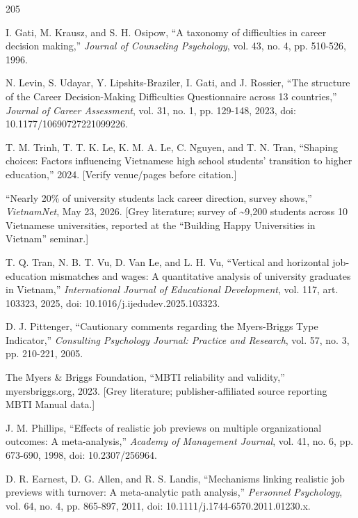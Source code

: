 \newpage
\begingroup\sloppy
\begin{thebibliography}{205}
 I. Gati, M. Krausz, and S. H. Osipow, ``A taxonomy of difficulties in career decision making,'' \textit{Journal of Counseling Psychology}, vol. 43, no. 4, pp. 510-526, 1996.

 N. Levin, S. Udayar, Y. Lipshits-\allowbreak{}Braziler, I. Gati, and J. Rossier, ``The structure of the Career Decision-\allowbreak{}Making Difficulties Questionnaire across 13 countries,'' \textit{Journal of Career Assessment}, vol. 31, no. 1, pp. 129-148, 2023, doi: 10.\allowbreak{}1177/\allowbreak{}10690727221099226.

 T. M. Trinh, T. T. K. Le, K. M. A. Le, C. Nguyen, and T. N. Tran, ``Shaping choices: Factors influencing Vietnamese high school students' transition to higher education,'' 2024. [Verify venue/pages before citation.]

 ``Nearly 20\% of university students lack career direction, survey shows,'' \textit{VietnamNet}, May 23, 2026. [Grey literature; survey of \textasciitilde{}9,200 students across 10 Vietnamese universities, reported at the ``Building Happy Universities in Vietnam'' seminar.]

 T. Q. Tran, N. B. T. Vu, D. Van Le, and L. H. Vu, ``Vertical and horizontal job-\allowbreak{}education mismatches and wages: A quantitative analysis of university graduates in Vietnam,'' \textit{International Journal of Educational Development}, vol. 117, art. 103323, 2025, doi: 10.\allowbreak{}1016/\allowbreak{}j.\allowbreak{}ijedudev.\allowbreak{}2025.\allowbreak{}103323.

 D. J. Pittenger, ``Cautionary comments regarding the Myers-\allowbreak{}Briggs Type Indicator,'' \textit{Consulting Psychology Journal: Practice and Research}, vol. 57, no. 3, pp. 210-221, 2005.

 The Myers \& Briggs Foundation, ``MBTI reliability and validity,'' myersbriggs.\allowbreak{}org, 2023. [Grey literature; publisher-\allowbreak{}affiliated source reporting MBTI Manual data.]

 J. M. Phillips, ``Effects of realistic job previews on multiple organizational outcomes: A meta-\allowbreak{}analysis,'' \textit{Academy of Management Journal}, vol. 41, no. 6, pp. 673-690, 1998, doi: 10.\allowbreak{}2307/\allowbreak{}256964.

 D. R. Earnest, D. G. Allen, and R. S. Landis, ``Mechanisms linking realistic job previews with turnover: A meta-\allowbreak{}analytic path analysis,'' \textit{Personnel Psychology}, vol. 64, no. 4, pp. 865-897, 2011, doi: 10.\allowbreak{}1111/\allowbreak{}j.\allowbreak{}1744-\allowbreak{}6570.\allowbreak{}2011.\allowbreak{}01230.\allowbreak{}x.


\end{thebibliography}
